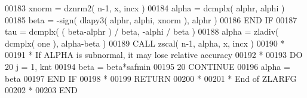 \begin{DoxyCode}
00183             xnorm = dznrm2( n-1, x, incx )
00184             alpha = dcmplx( alphr, alphi )
00185             beta = -sign( dlapy3( alphr, alphi, xnorm ), alphr )
00186 \textcolor{keywordflow}{         END IF}
00187          tau = dcmplx( ( beta-alphr ) / beta, -alphi / beta )
00188          alpha = zladiv( dcmplx( one ), alpha-beta )
00189          \textcolor{keyword}{CALL }zscal( n-1, alpha, x, incx )
00190 \textcolor{comment}{*}
00191 \textcolor{comment}{*        If ALPHA is subnormal, it may lose relative accuracy}
00192 \textcolor{comment}{*}
00193          \textcolor{keywordflow}{DO} 20 j = 1, knt
00194             beta = beta*safmin
00195  20      \textcolor{keywordflow}{CONTINUE}
00196          alpha = beta
00197 \textcolor{keywordflow}{      END IF}
00198 \textcolor{comment}{*}
00199       \textcolor{keywordflow}{RETURN}
00200 \textcolor{comment}{*}
00201 \textcolor{comment}{*     End of ZLARFG}
00202 \textcolor{comment}{*}
00203 \textcolor{keyword}{      END}
\end{DoxyCode}
